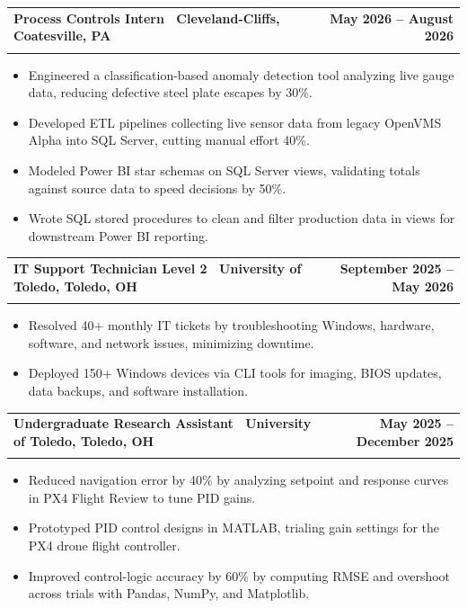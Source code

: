 \documentclass[letterpaper,11pt]{article}
\makeatletter
\newcommand{\resumeItem}[1]{\item\small{#1 \vspace{-4pt}}}
\newcommand{\resumeSubheading}[4]{
    \vspace{-2pt}\item
    \begin{tabular*}{1.0\textwidth}[t]{l@{\extracolsep{\fill}}r}
        \textbf{#1} & \textbf{\small #2} \\
        \textit{\small#3} & \textit{\small #4}
    \end{tabular*}\vspace{-7pt}
}
\newcommand{\resumeItemListStart}{\begin{itemize}}
\newcommand{\resumeItemListEnd}{\end{itemize}\vspace{-7pt}}
\makeatother
\begin{document}
\resumeSubheading
{\textbf{Process Controls Intern} \textnormal{\textbar\ Cleveland-Cliffs, Coatesville, PA}}{May 2026 -- August 2026}
{}{}
\vspace{-0.6cm}
\resumeItemListStart
\resumeItem{Engineered a classification-based anomaly detection tool analyzing live gauge data, reducing defective steel plate escapes by 30\%.}
\vspace{0.15cm}
\resumeItem{Developed ETL pipelines collecting live sensor data from legacy OpenVMS Alpha into SQL Server, cutting manual effort 40\%.}
\vspace{0.15cm}
\resumeItem{Modeled Power BI star schemas on SQL Server views, validating totals against source data to speed decisions by 50\%.}
\vspace{0.15cm}
\resumeItem{Wrote SQL stored procedures to clean and filter production data in views for downstream Power BI reporting.}
\vspace{0.15cm}
\resumeItemListEnd
\resumeSubheading
{\textbf{IT Support Technician Level 2} \textnormal{\textbar\ University of Toledo, Toledo, OH}}{September 2025 -- May 2026}
{}{}
\vspace{-0.6cm}
\resumeItemListStart
\resumeItem{Resolved 40+ monthly IT tickets by troubleshooting Windows, hardware, software, and network issues, minimizing downtime.}
\vspace{0.15cm}
\resumeItem{Deployed 150+ Windows devices via CLI tools for imaging, BIOS updates, data backups, and software installation.}
\vspace{0.15cm}
\resumeItemListEnd

\resumeSubheading
{\textbf{Undergraduate Research Assistant} \textnormal{\textbar\ University of Toledo, Toledo, OH}}{May 2025 -- December 2025}
{}{}
\vspace{-0.6cm}
\resumeItemListStart
\resumeItem{Reduced navigation error by 40\% by analyzing setpoint and response curves in PX4 Flight Review to tune PID gains.}
\vspace{0.15cm}
\resumeItem{Prototyped PID control designs in MATLAB, trialing gain settings for the PX4 drone flight controller.}
\vspace{0.15cm}
\resumeItem{Improved control-logic accuracy by 60\% by computing RMSE and overshoot across trials with Pandas, NumPy, and Matplotlib.}
\resumeItemListEnd

\end{document}

